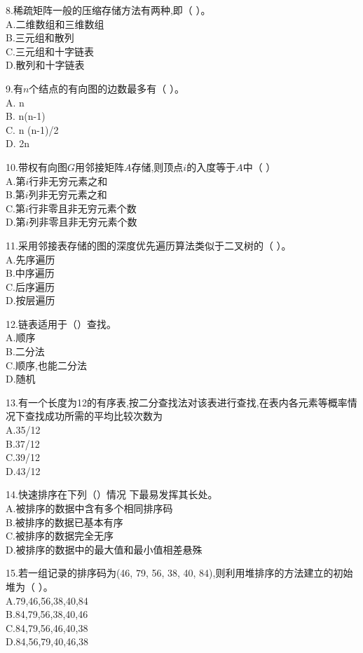 8.稀疏矩阵一般的压缩存储方法有两种,即（    ）。 \\
A.二维数组和三维数组 \\
B.三元组和散列 \\
C.三元组和十字链表 \\
D.散列和十字链表

9.有$n$个结点的有向图的边数最多有（    ）。 \\
A. n \\
B. n(n-1) \\
C. n (n-1)/2 \\
D. 2n

10.带权有向图$G$用邻接矩阵$A$存储,则顶点$i$的入度等于$A$中（    ） \\
A.第$i$行非无穷元素之和 \\
B.第$i$列非无穷元素之和 \\
C.第$i$行非零且非无穷元素个数 \\
D.第$i$列非零且非无穷元素个数

11.采用邻接表存储的图的深度优先遍历算法类似于二叉树的（  ）。 \\
A.先序遍历 \\
B.中序遍历 \\
C.后序遍历 \\
D.按层遍历

12.链表适用于（）查找。 \\
A.顺序 \\
B.二分法 \\
C.顺序,也能二分法 \\
D.随机

13.有一个长度为12的有序表,按二分查找法对该表进行查找,在表内各元素等概率情况下查找成功所需的平均比较次数为 \\
A.35/12 \\
B.37/12 \\
C.39/12 \\
D.43/12

14.快速排序在下列（）情况 下最易发挥其长处。 \\
A.被排序的数据中含有多个相同排序码 \\
B.被排序的数据已基本有序 \\
C.被排序的数据完全无序 \\
D.被排序的数据中的最大值和最小值相差悬殊

15.若一组记录的排序码为(46, 79, 56, 38, 40, 84),则利用堆排序的方法建立的初始堆为（  ）。 \\
A.79,46,56,38,40,84 \\
B.84,79,56,38,40,46 \\
C.84,79,56,46,40,38 \\
D.84,56,79,40,46,38

